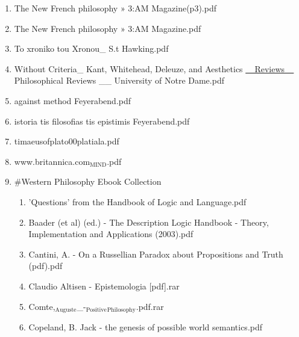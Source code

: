 \documentclass[11pt]{article}
\begin{document}
\begin{enumerate}
\item The New French philosophy » 3:AM Magazine(p3).pdf
\label{sec-1-1-1-1-34-17}

\item The New French philosophy » 3:AM Magazine.pdf
\label{sec-1-1-1-1-34-18}

\item To xroniko tou Xronou\_ S.t Hawking.pdf
\label{sec-1-1-1-1-34-19}

\item Without Criteria\_ Kant, Whitehead, Deleuze, and Aesthetics \uline{\_ Reviews \_} Philosophical Reviews \_\_ University of Notre Dame.pdf
\label{sec-1-1-1-1-34-20}

\item against method Feyerabend.pdf
\label{sec-1-1-1-1-34-21}

\item istoria tis filosofias tis epistimis Feyerabend.pdf
\label{sec-1-1-1-1-34-22}

\item timaeusofplato00platiala.pdf
\label{sec-1-1-1-1-34-23}

\item www.britannica.com$_{\text{MIND}}$.pdf
\label{sec-1-1-1-1-34-24}

\item \#Western Philosophy Ebook Collection
\label{sec-1-1-1-1-34-25}
\begin{enumerate}
\item 'Questions' from the Handbook of Logic and Language.pdf
\label{sec-1-1-1-1-34-25-1}

\item Baader (et al) (ed.) - The Description Logic Handbook - Theory, Implementation and Applications (2003).pdf
\label{sec-1-1-1-1-34-25-2}

\item Cantini, A. - On a Russellian Paradox about Propositions and Truth (pdf).pdf
\label{sec-1-1-1-1-34-25-3}

\item Claudio Altisen - Epistemologia [pdf].rar
\label{sec-1-1-1-1-34-25-4}

\item Comte,$_{\text{Auguste}}$\_-$_{\text{Positive}}$$_{\text{Philosophy}}$.pdf.rar
\label{sec-1-1-1-1-34-25-5}

\item Copeland, B. Jack - the genesis of possible world semantics.pdf
\label{sec-1-1-1-1-34-25-6}


\end{enumerate}
\end{enumerate}
\end{document}
